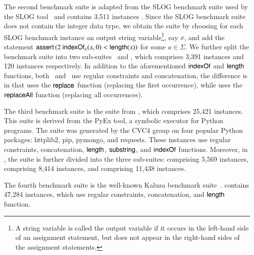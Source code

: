 The second benchmark suite {\slogbench} is adapted from the SLOG benchmark suite used by the SLOG tool~\cite{fang-yu-circuits} and contains 3,511 instances . 
Since the SLOG benchmark suite does not contain the integer data type,
we obtain the {\slogbench} suite by choosing for each SLOG benchmark instance an output string variable\footnote{A string variable is called the output variable if it occurs in the left-hand side of an assignment statement, but does not appear in the right-hand sides of the assignment statements.}, say $x$, and add the statement $\ASSERT{2\ \indexof_{a}(x, 0) < \length(x)}$ for some $a \in \Sigma$.
We further split the {\slogbench} benchmark suite into two sub-suites \slogbenchr\ and \slogbenchra, which comprises 3,391 instances  and 120 instances  respectively. In addition to the aforementioned $\mathsf{indexOf}$ and $\mathsf{length}$ functions, both  \slogbenchr\ and \slogbenchra\ use regular constraints and concatenation, the difference is in that {\slogbenchr} uses the $\mathsf{replace}$ function (replacing the first occurrence), while {\slogbenchra} uses the $\mathsf{replaceAll}$ function (replacing all occurrences).


The third benchmark suite is the {\pyexbench} suite from \cite{ReynoldsWBBLT17}, which comprises 25,421 instances. 
This suite is derived from the PyEx tool, a symbolic executor for Python programs. The {\pyexbench} suite was generated by the CVC4 group on four popular Python packages: httplib2, pip, pymongo, and requests. These instances use regular constraints, concatenation, $\mathsf{length}$, $\mathsf{substring}$, and $\mathsf{indexOf}$ functions. Moreover, in  \cite{ReynoldsWBBLT17}, the {\pyexbench} suite is further divided into the three sub-suites: {\pyextdbench} comprising 5,569 instances, {\pyexztbench} comprising 8,414 instances, and {\pyexzzbench} comprising 11,438 instances.

The fourth benchmark suite {\kaluzabench} is the well-known Kaluza benchmark suite~\cite{Berkeley-JavaScript}.
{\kaluzabench} contains 47,284 instances, which use regular constraints, concatenation, and $\mathsf{length}$ function.





